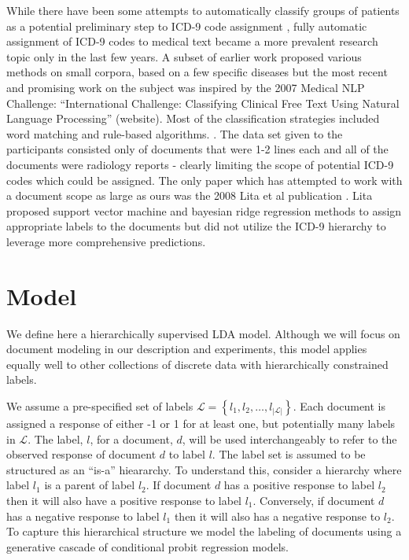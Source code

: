 \documentclass{article}
\begin{document}
While there have been some attempts to automatically classify groups
of patients as a potential preliminary step to ICD-9 code assignment
\citep{Ruch2008,FreitasJunior2006,RibeiroNeto2001,Brown2006}, fully
automatic assignment of ICD-9 codes to medical text became a more
prevalent research topic only in the last few years. A subset of earlier
work proposed various methods on small corpora, based on a few specific
diseases \citep{Rao2003} but the most recent and promising work on
the subject was inspired by the 2007 Medical NLP Challenge: {}``International
Challenge: Classifying Clinical Free Text Using Natural Language Processing\textquotedblright{}
(website). Most of the classification strategies included word matching
and rule-based algorithms. \citep{Goldstein2007,Crammer2007,Farkas2008}.
The data set given to the participants consisted only of documents
that were 1-2 lines each and all of the documents were radiology reports
- clearly limiting the scope of potential ICD-9 codes which could
be assigned. The only paper which has attempted to work with a document
scope as large as ours was the 2008 Lita et al publication \citep{Lita2008}.
Lita proposed support vector machine and bayesian ridge regression
methods to assign appropriate labels to the documents but did not
utilize the ICD-9 hierarchy to leverage more comprehensive predictions.


\section{Model}

\label{sec:model} We define here a hierarchically supervised LDA
model. Although we will focus on document modeling in our description
and experiments, this model applies equally well to other collections
of discrete data with hierarchically constrained labels. 

We assume a pre-specified set of labels $\mathcal{L}=\left\{ l_{1},l_{2},\ldots,l_{\left|\mathcal{L}\right|}\right\} $.
Each document is assigned a response of either -1 or 1 for at least
one, but potentially many labels in $\mathcal{L}$. The label, $l$,
for a document, $d$, will be used interchangeably to refer to the
observed response of document $d$ to label $l$. The label set is
assumed to be structured as an {}``is-a'' hieararchy.
To understand this, consider a hierarchy where label $l_{1}$ is a
parent of label $l_{2}$. If document $d$ has a positive response
to label $l_{2}$ then it will also have a positive response to label
$l_{1}$. Conversely, if document $d$ has a negative response to
label $l_{1}$ then it will also has a negative response to $l_{2}$.
To capture this hierarchical structure we model the labeling of documents
using a generative cascade of conditional probit regression models.
\end{document}
